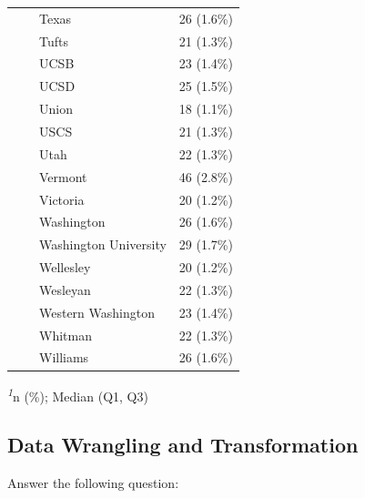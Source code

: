 \documentclass[
  letterpaper,
  DIV=11,
  numbers=noendperiod]{scrartcl}
\begin{document}
\begin{table}
\begin{tabular*}{\linewidth}{@{\extracolsep{\fill}}lc}
    Texas & 26 (1.6\%) \\ 
    Tufts & 21 (1.3\%) \\ 
    UCSB & 23 (1.4\%) \\ 
    UCSD & 25 (1.5\%) \\ 
    Union & 18 (1.1\%) \\ 
    USCS & 21 (1.3\%) \\ 
    Utah & 22 (1.3\%) \\ 
    Vermont & 46 (2.8\%) \\ 
    Victoria & 20 (1.2\%) \\ 
    Washington & 26 (1.6\%) \\ 
    Washington University & 29 (1.7\%) \\ 
    Wellesley & 20 (1.2\%) \\ 
    Wesleyan & 22 (1.3\%) \\ 
    Western Washington & 23 (1.4\%) \\ 
    Whitman & 22 (1.3\%) \\ 
    Williams & 26 (1.6\%) \\ 
\bottomrule
\end{tabular*}
\begin{minipage}{\linewidth}
\textsuperscript{\textit{1}}n (\%); Median (Q1, Q3)\\
\end{minipage}
\end{table}

\subsection{Data Wrangling and
Transformation}\label{data-wrangling-and-transformation}

Answer the following question:
\end{document}
